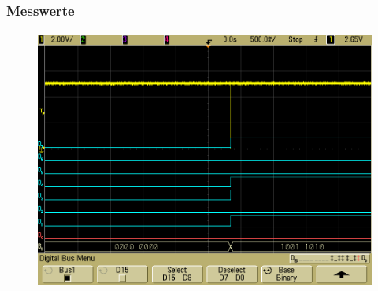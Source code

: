 \begin{frame}
    \frametitle{Messwerte}
    \framesubtitle{}
            \begin{figure}[H]
            \begin{center}
                    \includegraphics[scale=0.18]{./img/oszi/scope_11.png}
            \end{center}
            \end{figure}
            \begin{center}
            \end{center}
\end{frame}

